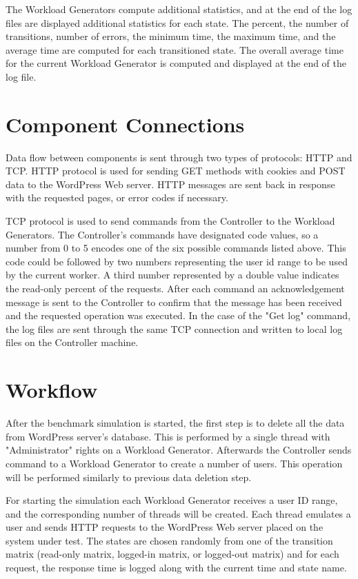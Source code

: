 The Workload Generators compute additional statistics, and at the end of the log files are displayed additional statistics for each state. The percent, the number of transitions, number of errors, the minimum time, the maximum time, and the average time are computed for each transitioned state. The overall average time for the current Workload Generator is computed and displayed at the end of the log file.

\section{Component Connections}
\label{sec:component-connections}

Data flow between components is sent through two types of protocols: HTTP and TCP. HTTP protocol is used for sending GET methods with cookies and POST data to the WordPress Web server. HTTP messages are sent back in response with the requested pages, or error codes if necessary. 

TCP protocol is used to send commands from the Controller to the Workload Generators. The Controller's commands have designated code values, so a number from 0 to 5 encodes one of the six possible commands listed above. This code could be followed by two numbers representing the user id range to be used by the current worker. A third number represented by a double value indicates the read-only percent of the requests. After each command an acknowledgement message is sent to the Controller to confirm that the message has been received and the requested operation was executed. In the case of the "Get log" command, the log files are sent through the same TCP connection and written to local log files on the Controller machine. 

\section{Workflow}
\label{sec:workflow}

After the benchmark simulation is started, the first step is to delete all the data from WordPress server's database. This is performed by a single thread with "Administrator" rights on a Workload Generator. Afterwards the Controller sends command to a Workload Generator to create a number of users. This operation will be performed similarly to previous data deletion step. 

For starting the simulation each Workload Generator receives a user ID range, and the corresponding number of threads will be created. Each thread emulates a user and sends HTTP requests to the WordPress Web server placed on the system under test. The states are chosen randomly from one of the transition matrix (read-only matrix, logged-in matrix, or logged-out matrix) and for each request, the response time is logged along with the current time and state name. 

